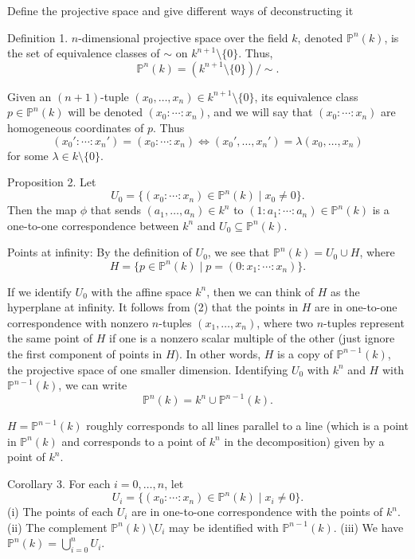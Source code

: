 Define the projective space and give different ways of deconstructing it

Definition 1. \( n \)-dimensional projective space over the field \(k\), denoted \(\mathbb{P}^n(k)\), is the set of equivalence classes of \(\sim\) on \(k^{n+1} \setminus \{0\}\). Thus,
\[
\mathbb{P}^n(k) = (k^{n+1} \setminus \{0\})/\sim.
\]

Given an \((n+1)\)-tuple \((x_0, \ldots, x_n) \in k^{n+1} \setminus \{0\}\), its equivalence class \(p \in \mathbb{P}^n(k)\) will be denoted \((x_0 : \cdots : x_n)\), and we will say that \((x_0 : \cdots : x_n)\) are homogeneous coordinates of \(p\). Thus
\[
(x_0' : \cdots : x_n') = (x_0 : \cdots : x_n)
\iff
(x_0',\ldots,x_n') = \lambda (x_0, \ldots, x_n)
\]
for some \(\lambda \in k \setminus \{0\}\).

Proposition 2. Let
\[
U_0 = \{ (x_0 : \cdots : x_n) \in \mathbb{P}^n(k) \mid x_0 \ne 0 \}.
\]
Then the map \(\phi\) that sends \((a_1, \ldots, a_n) \in k^n\) to \((1 : a_1 : \cdots : a_n) \in \mathbb{P}^n(k)\) is a one-to-one correspondence between \(k^n\) and \(U_0 \subseteq \mathbb{P}^n(k)\).

Points at infinity:
By the definition of \(U_0\), we see that \(\mathbb{P}^n(k) = U_0 \cup H\), where
\[
H = \{ p \in \mathbb{P}^n(k) \mid p = (0 : x_1 : \cdots : x_n) \}.
\]

If we identify \(U_0\) with the affine space \(k^n\), then we can think of \(H\) as the hyperplane at infinity. It follows from (2) that the points in \(H\) are in one-to-one correspondence with nonzero \(n\)-tuples \((x_1, \ldots, x_n)\), where two \(n\)-tuples represent the same point of \(H\) if one is a nonzero scalar multiple of the other (just ignore the first component of points in \(H\)). In other words, \(H\) is a copy of \(\mathbb{P}^{n-1}(k)\), the projective space of one smaller dimension. Identifying \(U_0\) with \(k^n\) and \(H\) with \(\mathbb{P}^{n-1}(k)\), we can write
\[
\mathbb{P}^n(k) = k^n \cup \mathbb{P}^{n-1}(k).
\]

\(H = \mathbb{P}^{n-1}(k)\) roughly corresponds to all lines parallel to a line (which is a point in \( \mathbb{P}^n(k) \) and corresponds to a point of \( k^n \) in the decomposition) given by a point of \( k^n \).

Corollary 3. For each \(i = 0, \ldots, n\), let
\[
U_i = \{ (x_0 : \cdots : x_n) \in \mathbb{P}^n(k) \mid x_i \ne 0 \}.
\]
(i) The points of each \(U_i\) are in one-to-one correspondence with the points of \(k^n\).
(ii) The complement \(\mathbb{P}^n(k) \setminus U_i\) may be identified with \(\mathbb{P}^{n-1}(k)\).
(iii) We have \(\mathbb{P}^n(k) = \bigcup_{i=0}^n U_i\).


